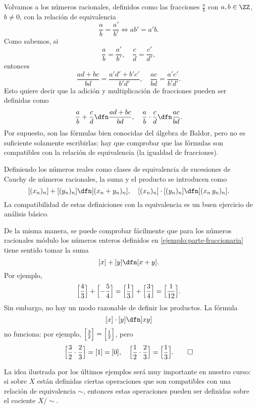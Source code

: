 \begin{ejemplo}
  Volvamos a los números racionales, definidos como las fracciones $\frac{a}{b}$
  con $a,b\in \ZZ$, $b \ne 0$, con la relación de equivalencia
  $$\frac{a}{b} = \frac{a'}{b'} \iff ab' = a'b.$$
  Como sabemos, si
  $$\frac{a}{b} = \frac{a'}{b'}, \quad \frac{c}{d} = \frac{c'}{d'},$$
  entonces
  \[ \frac{ad + bc}{bd} = \frac{a' d' + b' c'}{b' d'}, \quad
    \frac{ac}{bd} = \frac{a'c'}{b'd'}. \]
  Esto quiere decir que la adición y multiplicación de fracciones pueden ser
  definidas como
  \[ \frac{a}{b} + \frac{c}{d} \dfn \frac{ad + bc}{bd}, \quad
    \frac{a}{b}\cdot \frac{c}{d} \dfn \frac{ac}{bd}. \]
  Por supuesto, son las fórmulas bien conocidas del álgebra de Baldor, pero no
  es suficiente solamente escribirlas: hay que comprobar que las fórmulas son
  compatibles con la relación de equivalencia (la igualdad de fracciones).
\end{ejemplo}

\begin{ejemplo}
  Definiendo los números reales como clases de equivalencia de sucesiones de
  Cauchy de números racionales, la suma y el producto se introducen como
  \[ [(x_n)_n] + [(y_n)_n] \dfn [(x_n + y_n)_n], \quad
    [(x_n)_n] \cdot [(y_n)_n] \dfn [(x_n\,y_n)_n]. \]
  La compatibilidad de estas definiciones con la equivalencia es un buen
  ejercicio de análisis básico.
\end{ejemplo}

\begin{ejemplo}
  De la misma manera, se puede comprobar fácilmente que para los números
  racionales módulo los números enteros definidos en
  \ref{ejemplo:parte-fraccionaria} tiene sentido tomar la suma
  $$[x] + [y] \dfn [x+y].$$
  Por ejemplo,
  \[ \Bigl[\frac{4}{3}\Bigr] + \Bigl[-\frac{5}{4}\Bigr] =
    \Bigl[\frac{1}{3}\Bigr] + \Bigl[\frac{3}{4}\Bigr] =
    \Bigl[\frac{1}{12}\Bigr]. \]
  Sin embargo, no hay un modo razonable de definir los productos. La fórmula
  $$[x]\cdot [y] \dfn [xy]$$
  no funciona: por ejemplo, $\Bigl[\frac{3}{2}\Bigr] = \Bigl[\frac{1}{2}\Bigr]$,
  pero
  \[ \Bigl[\frac{3}{2}\cdot\frac{2}{3}\Bigr] = [1] = [0], \quad
    \Bigl[\frac{1}{2}\cdot\frac{2}{3}\Bigr] = \Bigl[\frac{1}{3}\Bigr]. \qedhere \]
\end{ejemplo}

La idea ilustrada por los últimos ejemplos será muy importante en nuestro curso:
si sobre $X$ están definidas ciertas operaciones que son compatibles con una
relación de equivalencia $\sim$, entonces estas operaciones pueden ser definidas
sobre el cociente $X/\!\sim$.
